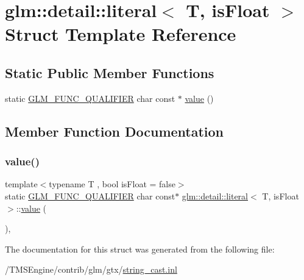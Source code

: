 \hypertarget{structglm_1_1detail_1_1literal}{}\section{glm\+:\+:detail\+:\+:literal$<$ T, is\+Float $>$ Struct Template Reference}
\label{structglm_1_1detail_1_1literal}
\subsection*{Static Public Member Functions}
\begin{DoxyCompactItemize}
\item 
static \hyperlink{setup_8hpp_a33fdea6f91c5f834105f7415e2a64407}{G\+L\+M\+\_\+\+F\+U\+N\+C\+\_\+\+Q\+U\+A\+L\+I\+F\+I\+ER} char const  $\ast$ \hyperlink{structglm_1_1detail_1_1literal_a14fd9d6fec8d35f7a2fd3b0095d17b6a}{value} ()
\end{DoxyCompactItemize}


\subsection{Member Function Documentation}
\mbox{\label{structglm_1_1detail_1_1literal_a14fd9d6fec8d35f7a2fd3b0095d17b6a}} 
\subsubsection{\texorpdfstring{value()}{value()}}
{\footnotesize\ttfamily template$<$typename T , bool is\+Float = false$>$ \\
static \hyperlink{setup_8hpp_a33fdea6f91c5f834105f7415e2a64407}{G\+L\+M\+\_\+\+F\+U\+N\+C\+\_\+\+Q\+U\+A\+L\+I\+F\+I\+ER} char const$\ast$ \hyperlink{structglm_1_1detail_1_1literal}{glm\+::detail\+::literal}$<$ T, is\+Float $>$\+::\hyperlink{_s_d_l__opengl__glext_8h_a8ad81492d410ff2ac11f754f4042150f}{value} (\begin{DoxyParamCaption}{ }\end{DoxyParamCaption})\hspace{0.3cm}{\ttfamily [inline]}, {\ttfamily [static]}}



The documentation for this struct was generated from the following file\+:\begin{DoxyCompactItemize}
\item 
/\+T\+M\+S\+Engine/contrib/glm/gtx/\hyperlink{string__cast_8inl}{string\+\_\+cast.\+inl}\end{DoxyCompactItemize}
